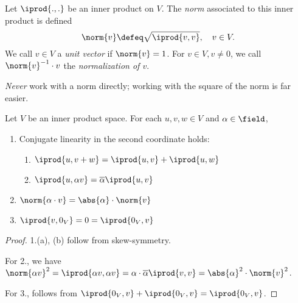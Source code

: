 \begin{definition}
    Let $\iprod{.,.}$ be an inner product on $V$. The \emph{norm} associated to this inner product is defined \[
    \norm{v} \defeq \sqrt{\iprod{v,v}}, \quad v \in V.
    \]
    We call $v \in V$ a \emph{unit vector} if $\norm{v} = 1$. For $v \in V, v \neq 0$, we call $\norm{v}^{-1} \cdot v$ the \emph{normalization of $v$}.
\end{definition}

\begin{remark}
    \emph{Never} work with a norm directly; working with the square of the norm is far easier.
\end{remark}

\begin{proposition}
    Let $V$ be an inner product space. For each $u, v, w \in V$ and $\alpha \in \field$,
    \begin{enumerate}
        \item Conjugate linearity in the second coordinate holds:
        \begin{enumerate}
            \item $\iprod{u, v + w} = \iprod{u, v} + \iprod{u, w}$
            \item $\iprod{u, \alpha v} = \overline{\alpha} \iprod{u, v}$
        \end{enumerate}
        \item $\norm{\alpha\cdot  v} = \abs{\alpha} \cdot \norm{v}$
        \item $\iprod{v, 0_V} = 0 = \iprod{0_V, v}$
    \end{enumerate}
\end{proposition}
\begin{proof}
    1.(a), (b) follow from skew-symmetry.

    For 2., we have $\norm{\alpha v}^2 = \iprod{\alpha v, \alpha v} = \alpha \cdot \overline{\alpha} \iprod{v, v} = \abs{\alpha}^2 \cdot \norm{v}^2$.

    For 3., follows from $\iprod{0_V, v} + \iprod{0_V, v} = \iprod{0_V, v}$.
\end{proof}

